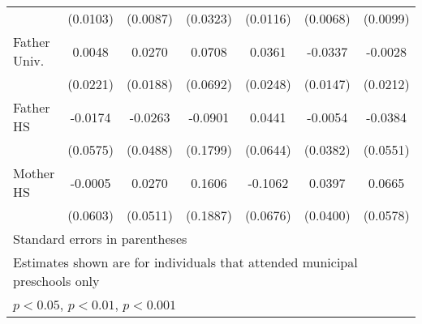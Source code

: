 \begin{table}[htbp]
\begin{tabular}{l*{6}{c}}
            &    (0.0103)         &    (0.0087)         &    (0.0323)         &    (0.0116)         &    (0.0068)         &    (0.0099)         \\
\addlinespace
Father Univ.&      0.0048         &      0.0270         &      0.0708         &      0.0361         &     -0.0337\sym{*}  &     -0.0028         \\
            &    (0.0221)         &    (0.0188)         &    (0.0692)         &    (0.0248)         &    (0.0147)         &    (0.0212)         \\
\addlinespace
Father HS   &     -0.0174         &     -0.0263         &     -0.0901         &      0.0441         &     -0.0054         &     -0.0384         \\
            &    (0.0575)         &    (0.0488)         &    (0.1799)         &    (0.0644)         &    (0.0382)         &    (0.0551)         \\
\addlinespace
Mother HS   &     -0.0005         &      0.0270         &      0.1606         &     -0.1062         &      0.0397         &      0.0665         \\
            &    (0.0603)         &    (0.0511)         &    (0.1887)         &    (0.0676)         &    (0.0400)         &    (0.0578)         \\
\bottomrule
\multicolumn{7}{l}{\footnotesize Standard errors in parentheses}\\
\multicolumn{7}{l}{\footnotesize Estimates shown are for individuals that attended municipal preschools only}\\
\multicolumn{7}{l}{\footnotesize \sym{*} \(p<0.05\), \sym{**} \(p<0.01\), \sym{***} \(p<0.001\)}\\
\end{tabular}
\end{table}
